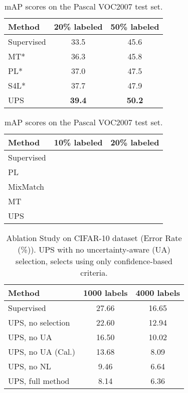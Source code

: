 \documentclass{article} \usepackage{iclr2021_conference,times}
\begin{document}
\begin{table}[t]
\begin{minipage}{.48\linewidth}
\vspace{-4mm}
\caption{Accuracy (\%) on the UCF-101 test set. Methods with * use scores reported in \citep{jing2020videossl}.}
\label{tab:comaprison_SSL_UCF101}
\centering
\small
\begin{tabular}{l|cc}
\hline
Method & 20\% labeled & 50\% labeled \\ \hline
Supervised & 33.5 & 45.6 \\
MT*  & 36.3 & 45.8 \\
PL*  & 37.0 & 47.5  \\
S4L* & 37.7 & 47.9 \\  \hline
UPS & \textbf{39.4} & \textbf{50.2}\\ \hline
\end{tabular}
\vspace{-4mm}

\end{minipage}\hfill
\begin{minipage}{.48\linewidth}
\vspace{-4mm}
\caption{mAP scores on the Pascal VOC2007 test set.}
\label{tab:comaprison_SSL_PASCALVOC}
\centering
\small
\begin{tabular}{l|cc}
\hline
Method & 10\% labeled & 20\% labeled \\ \hline
Supervised &  &  \\ 
PL  &  &  \\
MixMatch  &  &  \\
MT  &  &  \\ 
\hline
UPS &  &  \\ \hline
\end{tabular}
\end{minipage} 
\end{table}













\begin{wraptable}{r}{0.48\linewidth}
\vspace{-4mm}
\caption{Ablation Study on CIFAR-10 dataset (Error Rate (\%)). UPS with no uncertainty-aware (UA) selection, selects using only confidence-based criteria.}

\label{tab:ablation}
\small
\centering
\begin{tabular}{l|cc}
\hline
Method & 1000 labels & 4000 labels \\ \hline
Supervised &  27.66 & 16.65 \\
UPS, no selection &  22.60 & 12.94 \\ 
UPS, no UA & 16.50 & 10.02 \\ UPS, no UA (Cal.) & 13.68 & 8.09 \\ UPS, no NL &  9.46 & 6.64 \\ \hline UPS, full method & 8.14 & 6.36 \\ \hline
\end{tabular}
\end{wraptable} 
\end{document}
